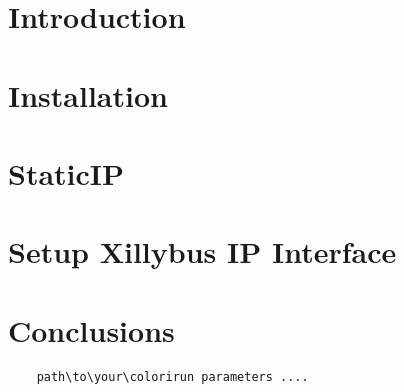         \pagebreak
             
        \section{Introduction}
        \label{sec:introduction}

        \section{Installation}
        \label{sec:installation}
        
        \section{StaticIP}
        \label{sec:StaticIP}
        

        \section{Setup Xillybus IP Interface}
        \label{sec:xillybusIP}
        

        \section{Conclusions}
        \label{sec:conclusion}

\begin{lstlisting}
    path\to\your\colorirun parameters ....
\end{lstlisting}
        
        \pagebreak
        
        
        


